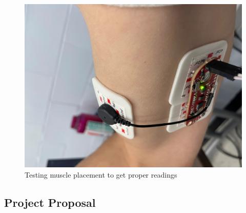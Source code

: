 \documentclass[11pt,letterpaper]{article}
\begin{document}
\begin{figure}[htbp]
\centering
\includegraphics[scale=0.1]{Progress_Report/figs/SensorPlacement.jpg}
\caption{Testing muscle placement to get proper readings} %
\label{fig:sensorplacement}
\end{figure}
\newpage
\subsection*{Project Proposal}



\end{document}
